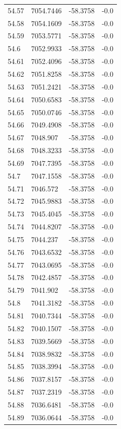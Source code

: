 \begin{table}[H]
\begin{tabular}{llll}
54.57 & 7054.7446 & -58.3758 & -0.0 \\
54.58 & 7054.1609 & -58.3758 & -0.0 \\
54.59 & 7053.5771 & -58.3758 & -0.0 \\
54.6 & 7052.9933 & -58.3758 & -0.0 \\
54.61 & 7052.4096 & -58.3758 & -0.0 \\
54.62 & 7051.8258 & -58.3758 & -0.0 \\
54.63 & 7051.2421 & -58.3758 & -0.0 \\
54.64 & 7050.6583 & -58.3758 & -0.0 \\
54.65 & 7050.0746 & -58.3758 & -0.0 \\
54.66 & 7049.4908 & -58.3758 & -0.0 \\
54.67 & 7048.907 & -58.3758 & -0.0 \\
54.68 & 7048.3233 & -58.3758 & -0.0 \\
54.69 & 7047.7395 & -58.3758 & -0.0 \\
54.7 & 7047.1558 & -58.3758 & -0.0 \\
54.71 & 7046.572 & -58.3758 & -0.0 \\
54.72 & 7045.9883 & -58.3758 & -0.0 \\
54.73 & 7045.4045 & -58.3758 & -0.0 \\
54.74 & 7044.8207 & -58.3758 & -0.0 \\
54.75 & 7044.237 & -58.3758 & -0.0 \\
54.76 & 7043.6532 & -58.3758 & -0.0 \\
54.77 & 7043.0695 & -58.3758 & -0.0 \\
54.78 & 7042.4857 & -58.3758 & -0.0 \\
54.79 & 7041.902 & -58.3758 & -0.0 \\
54.8 & 7041.3182 & -58.3758 & -0.0 \\
54.81 & 7040.7344 & -58.3758 & -0.0 \\
54.82 & 7040.1507 & -58.3758 & -0.0 \\
54.83 & 7039.5669 & -58.3758 & -0.0 \\
54.84 & 7038.9832 & -58.3758 & -0.0 \\
54.85 & 7038.3994 & -58.3758 & -0.0 \\
54.86 & 7037.8157 & -58.3758 & -0.0 \\
54.87 & 7037.2319 & -58.3758 & -0.0 \\
54.88 & 7036.6481 & -58.3758 & -0.0 \\
54.89 & 7036.0644 & -58.3758 & -0.0 \\

\end{tabular}
\end{table}
